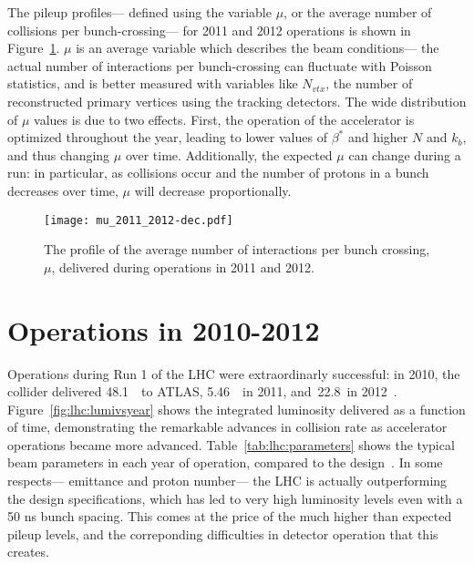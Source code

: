 The pileup profiles--- defined using the variable $\mu$, or the average number of collisions per bunch-crossing--- for 2011 and 2012 operations is shown in Figure~\ref{fig:lhc:mu-profile}. $\mu$ is an average variable which describes the beam conditions--- the actual number of interactions per bunch-crossing can fluctuate with Poisson statistics, and is better measured with variables like $N_{vtx}$, the number of reconstructed primary vertices using the tracking detectors. The wide distribution of $\mu$ values is due to two effects. First, the operation of the accelerator is optimized throughout the year, leading to lower values of $\beta^*$ and higher $N$ and $k_b$, and thus changing $\mu$ over time. Additionally, the expected $\mu$ can change during a run: in particular, as collisions occur and the number of protons in a bunch decreases over time, $\mu$ will decrease proportionally.


\begin{figure}
\centering
\texttt{[image: mu\_2011\_2012-dec.pdf]}
\caption{The profile of the average number of interactions per bunch crossing, $\mu$, delivered during operations in 2011 and 2012.}
\label{fig:lhc:mu-profile}
\end{figure}



\section{Operations in 2010-2012}

Operations during Run 1 of the LHC were extraordinarly successful: in 2010, the collider delivered 48.1~\ipb~to ATLAS, 5.46~\ifb~in 2011, and~22.8~\ifb in 2012~\cite{LHC2008-2013}. Figure~\ref{fig:lhc:lumivsyear} shows the integrated luminosity delivered as a function of time, demonstrating the remarkable advances in collision rate as accelerator operations became more advanced. Table~\ref{tab:lhc:parameters} shows the typical beam parameters in each year of operation, compared to the design~\cite{LHC2008-2013}. In some respects--- emittance and proton number--- the LHC is actually outperforming the design specifications, which has led to very high luminosity levels even with a 50 ns bunch spacing. This comes at the price of the much higher than expected pileup levels, and the correponding difficulties in detector operation that this creates.


